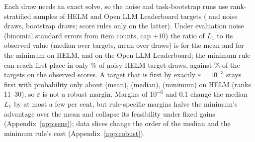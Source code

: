 Each draw needs an exact solve, so the noise and task-bootstrap runs use rank-stratified samples of \noiseNHelm{} HELM and \noiseNOllb{} Open LLM Leaderboard targets (\noiseDrawsHelm{} and \noiseDrawsOllb{} noise draws, \tbootDrawsHelm{} bootstrap draws; score rules only on the latter). Under evaluation noise (binomial standard errors from item counts, cap $+10$) the ratio of $L_1$ to its observed value (median over targets, mean over draws) is \noiseRatioHelmMean{} for the mean and \noiseRatioHelmMin{} for the minimum on HELM, \noiseRatioOllbMean{} and \noiseRatioOllbMin{} on the Open LLM Leaderboard; the minimum rule can reach first place in only \noiseFeasHelmMin\% of noisy HELM target-draws, against \noiseFeasObsHelmMin\% of the targets on the observed scores. A target that is first by exactly $\varepsilon=10^{-3}$ stays first with probability only about \flipPHelmMean{} (mean), \flipPHelmMedian{} (median), \flipPHelmMin{} (minimum) on HELM (ranks 11--30), so $\varepsilon$ is not a robust margin. Margins of $10^{-6}$ and $0.1$ change the median $L_1$ by at most a few per cent, but rule-specific margins halve the minimum's advantage over the mean and collapse its feasibility under fixed gains (Appendix~\ref{app:sens}); data slices change the order of the median and the minimum rule's cost (Appendix~\ref{app:robust}).
